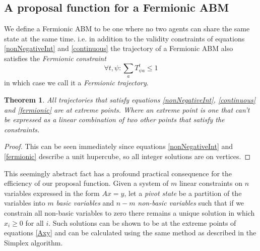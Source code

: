 \documentclass{article}
\newtheorem{theorem}{Theorem}
\begin{document}
\subsection{A proposal function for a Fermionic ABM}

We define a Fermionic ABM to be one where no two agents can share the same state at the same time. i.e. in addition to the validity constraints of equations \ref{nonNegativeInt} and \ref{continuous} the trajectory of a Fermionic ABM also satisfies the \textit{Fermionic constraint}
\begin{equation}
\forall t,\psi: \sum_a T^t_{\psi a} \le 1
\label{fermionic}
\end{equation}
in which case we call it a \textit{Fermionic trajectory}.

\begin{theorem}
All trajectories that satisfy equations \ref{nonNegativeInt}, \ref{continuous} and \ref{fermionic} are at extreme points. Where an extreme point is one that can't be expressed as a linear combination of two other points that satisfy the constraints.
\end{theorem}
\begin{proof}
This can be seen immediately since equations \ref{nonNegativeInt} and \ref{fermionic} describe a unit hupercube, so all integer solutions are on vertices.
\end{proof}


This seemingly abstract fact has a profound practical consequence for the efficiency of our proposal function.
Given a system of $m$ linear constraints on $n$ variables expressed in the form $Ax=y$, let a \textit{pivot state} be a partition of the variables into $m$ \textit{basic variables} and $n-m$ \textit{non-basic variables} such that if we constrain all non-basic variables to zero there remains a unique solution in which $x_i \ge 0$ for all $i$. Such solutions can be shown to be at the extreme points of equations \ref{Axy}\cite{dantzig1955generalized} and can be calculated using the same method as described in the Simplex algorithm\cite{dantzig1955generalized}\cite{vanderbei2015linear}.
\end{document}
